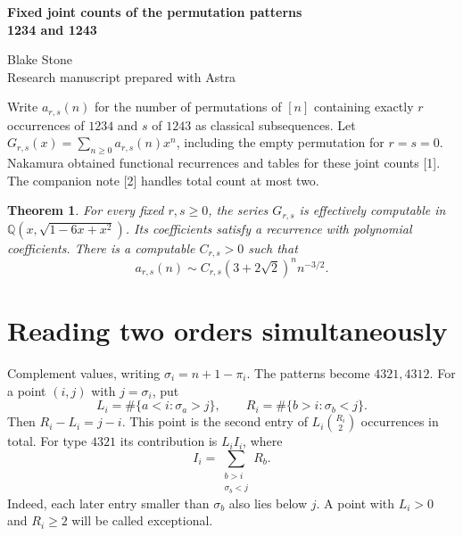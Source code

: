 \documentclass[11pt,letterpaper]{article}
\newtheorem{theorem}{Theorem}
\newcommand{\Q}{\mathbb Q}
\begin{document}
\thispagestyle{plain}
\begin{center}
{\LARGE\bfseries Fixed joint counts of the permutation patterns\\[2pt] 1234 and 1243\par}
\vspace{0.4em}Blake Stone\\{\small Research manuscript prepared with Astra}
\end{center}
\begin{abstract}
For every fixed pair of nonnegative occurrence counts the length generating function belongs to the same quadratic field as the large Schröder series. All these classes have growth $C(3+2\sqrt2)^n n^{-3/2}$ with a positive, computable constant. We give the reduced rational function in a Schröder parameter for two occurrences of each pattern, OEIS A224294. Its coefficients are asymptotically $(2759\sqrt2-2999)/64$ times the number avoiding both patterns.
\end{abstract}

Write $a_{r,s}(n)$ for the number of permutations of $[n]$ containing exactly $r$ occurrences of $1234$ and $s$ of $1243$ as classical subsequences. Let $G_{r,s}(x)=\sum_{n\ge0}a_{r,s}(n)x^n$, including the empty permutation for $r=s=0$. Nakamura obtained functional recurrences and tables for these joint counts [1]. The companion note [2] handles total count at most two.
\begin{theorem}\label{univ}
For every fixed $r,s\ge0$, the series $G_{r,s}$ is effectively computable in $\Q(x,\sqrt{1-6x+x^2})$. Its coefficients satisfy a recurrence with polynomial coefficients. There is a computable $C_{r,s}>0$ such that
\[
 a_{r,s}(n)\sim C_{r,s}(3+2\sqrt2)^n n^{-3/2}.
\]
\end{theorem}

\section{Reading two orders simultaneously}
Complement values, writing $\sigma_i=n+1-\pi_i$. The patterns become $4321,4312$. For a point $(i,j)$ with $j=\sigma_i$, put
\[
 L_i=\#\{a<i:\sigma_a>j\},\qquad R_i=\#\{b>i:\sigma_b<j\}.
\]
Then $R_i-L_i=j-i$. This point is the second entry of $L_i\binom{R_i}{2}$ occurrences in total. For type $4321$ its contribution is $L_i I_i$, where
\[
 I_i=\sum_{\substack{b>i\\ \sigma_b<j}} R_b. \tag{1}
\]
Indeed, each later entry smaller than $\sigma_b$ also lies below $j$. A point with $L_i>0$ and $R_i\ge2$ will be called exceptional.
\end{document}
